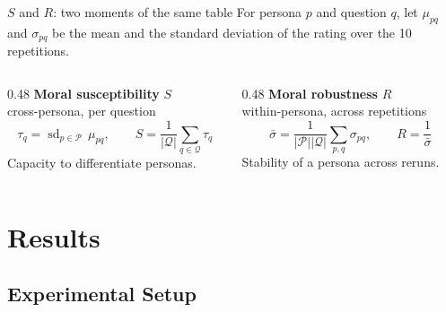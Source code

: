 \documentclass[aspectratio=169]{beamer}
\begin{document}
\begin{frame}{$S$ and $R$: two moments of the same table}
  \vspace{0.4em}
  {\small For persona $p$ and question $q$, let $\mu_{pq}$ and $\sigma_{pq}$ be the mean and the
   standard deviation of the rating over the 10 repetitions.}
  \vspace{1.2em}
  \begin{columns}[T]
    \begin{column}{0.48\textwidth}
      \textbf{Moral susceptibility} $S$\\[0.2em]
      {\small cross-persona, per question}
      \begin{equation*}
        \tau_q = \operatorname{sd}_{p \in \mathcal{P}}\,\mu_{pq}, \qquad
        S = \frac{1}{|\mathcal{Q}|} \sum_{q \in \mathcal{Q}} \tau_q
      \end{equation*}
      {\small Capacity to differentiate personas.}
    \end{column}
    \begin{column}{0.48\textwidth}
      \textbf{Moral robustness} $R$\\[0.2em]
      {\small within-persona, across repetitions}
      \begin{equation*}
        \bar{\sigma} = \frac{1}{|\mathcal{P}||\mathcal{Q}|} \sum_{p,q} \sigma_{pq}, \qquad
        R = \frac{1}{\bar{\sigma}}
      \end{equation*}
      {\small Stability of a persona across reruns.}
    \end{column}
  \end{columns}
\end{frame}

\section{Results}

\subsection{Experimental Setup}
\end{document}
